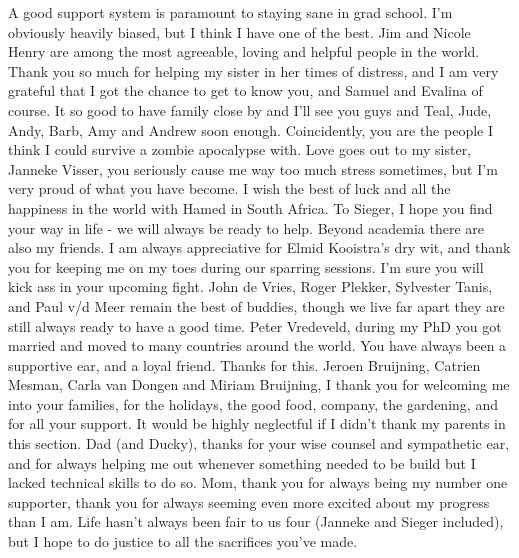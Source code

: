 \documentclass[b5paper,justified]{tufte-book} %
\begin{document}
\begin{fullwidth}
A good support system is paramount to staying sane in grad school. I'm obviously heavily biased, but I think I have one of the best. Jim and Nicole Henry are among the most agreeable, loving and helpful people in the world. Thank you so much for helping my sister in her times of distress, and I am very grateful that I got the chance to get to know you, and Samuel and Evalina of course. It so good to have family close by and I'll see you guys and Teal, Jude, Andy, Barb, Amy and Andrew soon enough. Coincidently, you are the people I think I could survive a zombie apocalypse with. Love goes out to my sister, Janneke Visser, you seriously cause me way too much stress sometimes, but I'm very proud of what you have become. I wish the best of luck and all the happiness in the world with Hamed in South Africa. To Sieger, I hope you find your way in life - we will always be ready to help. Beyond academia there are also my friends. I am always appreciative for Elmid Kooistra's dry wit, and thank you for keeping me on my toes during our sparring sessions. I'm sure you will kick ass in your upcoming fight. John de Vries, Roger Plekker, Sylvester Tanis, and Paul v/d Meer remain the best of buddies, though we live far apart they are still always ready to have a good time. Peter Vredeveld, during my PhD you got married and moved to many countries around the world. You have always been a supportive ear, and a loyal friend. Thanks for this.  Jeroen Bruijning, Catrien Mesman, Carla van Dongen and Miriam Bruijning, I thank you for welcoming me into your families, for the holidays, the good food, company, the gardening, and for all your support.  It would be highly neglectful if I didn't thank my parents in this section. Dad (and Ducky), thanks for your wise counsel and sympathetic ear, and for always helping me out whenever something needed to be build but I lacked technical skills to do so. Mom, thank you for always being my number one supporter, thank you for always seeming even more excited about my progress than I am. Life hasn't always been fair to us four (Janneke and Sieger included), but I hope to do justice to all the sacrifices you've made. 
 	

\end{fullwidth}
\end{document}
